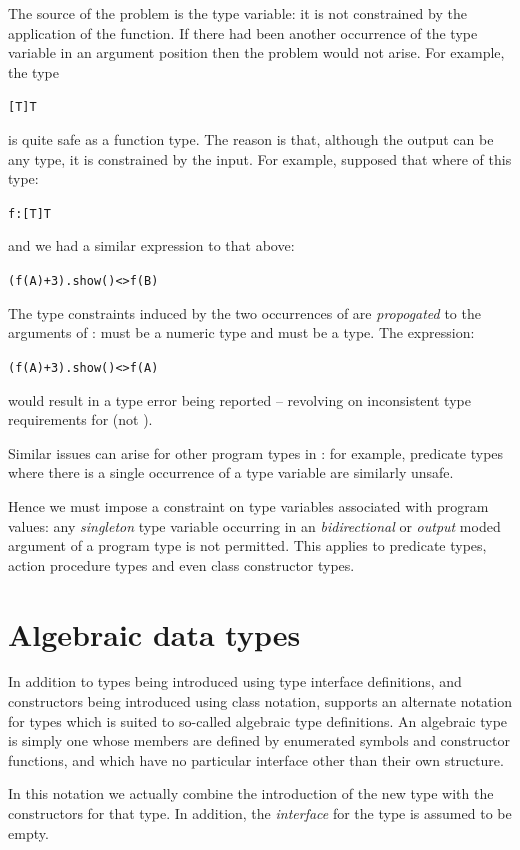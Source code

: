 The source of the problem is the type variable: it is not constrained by the application of the function. If there had been another occurrence of the type variable  in an argument position then the problem would not arise. For example, the type
\begin{alltt}
[T]\funarrow{}T
\end{alltt}
is quite safe as a function type. The reason is that, although the output can be any type, it is constrained by the input. For example, supposed that  where of this type:
\begin{alltt}
f:[T]\funarrow{}T
\end{alltt}
and we had a similar expression to that above:
\begin{alltt}
(f(A)+3).show()<>f(B)
\end{alltt}
The type constraints induced by the two occurrences of  are \emph{propogated} to the arguments of :  must be a numeric type and \q{} must be a  type. The expression:
\begin{alltt}
(f(A)+3).show()<>f(A)
\end{alltt}
would result in a type error being reported -- revolving on inconsistent type requirements for  (not ).

Similar issues can arise for other program types in \go: for example, predicate types where there is a single occurrence of a type variable are similarly unsafe.

Hence we must impose a constraint on type variables associated with program values: any \emph{singleton} type variable occurring in an \emph{bidirectional} or \emph{output} moded argument of a program type is not permitted. This applies to predicate types, action procedure types and even class constructor types.

\section{Algebraic data types}
\label{type:user}

In addition to types being introduced using type interface definitions, and constructors being introduced using class notation, \go supports an alternate notation for types which is suited to so-called algebraic type definitions. An algebraic type is simply one whose members are defined by enumerated symbols and constructor functions, and which have no particular interface other than their own structure.

In this notation we actually combine the introduction of the new type with the constructors for that type. In addition, the \emph{interface} for the type is assumed to be empty.

